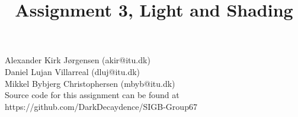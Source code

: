 \documentclass{article}
\title{Assignment 3, Light and Shading}
\begin{document}
	\maketitle
	\begin{center}
	Alexander Kirk Jørgensen (akir@itu.dk)\\
	Daniel Lujan Villarreal (dluj@itu.dk)\\
	Mikkel Bybjerg Christophersen (mbyb@itu.dk)\\[0.5cm]
	Source code for this assignment can be found at https://github.com/DarkDecaydence/SIGB-Group67
		
	\newpage
	\tableofcontents
	\newpage
	\end{center}
	
	
	
	
	
	
\end{document}
